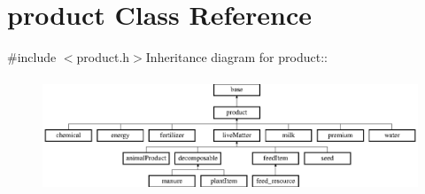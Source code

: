 \hypertarget{classproduct}{
\section{product Class Reference}
\label{classproduct}
}


{\ttfamily \#include $<$product.h$>$}Inheritance diagram for product::\begin{figure}[H]
\begin{center}
\leavevmode
\includegraphics[height=3.39806cm]{classproduct}
\end{center}
\end{figure}
